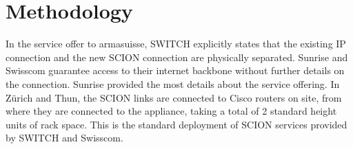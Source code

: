 \chapter{Methodology}
\label{ch:methodology}

In the service offer to armasuisse, SWITCH explicitly states that the
existing IP connection and the new SCION connection are physically separated.
Sunrise and Swisscom guarantee access to their internet backbone without further
details on the connection. Sunrise provided the most details about the service
offering. In Zürich and Thun, the SCION links are connected to Cisco routers on
site, from where they are connected to the appliance, taking a total of 2 standard
height units of rack space. This is the standard deployment of SCION services
provided by SWITCH and Swisscom.

\cite{Hager2024}



